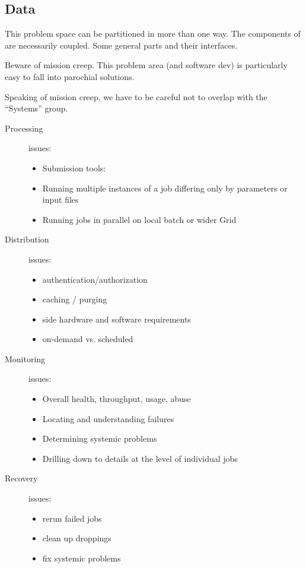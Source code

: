 \subsection{Data}

This problem space can be partitioned in more than one way.  The
components of are necessarily coupled.  Some general parts and their
interfaces.

Beware of mission creep.  This problem area (and software dev) is particularly easy to fall into parochial solutions.

Speaking of mission creep, we have to be careful not to overlap with the ``Systems'' group.

\begin{description}
\item[Processing] issues:

  \begin{itemize}
  \item Submission tools:
  \item Running multiple instances of a job differing only by parameters or input files
  \item Running jobs in parallel on local batch or wider Grid
  \end{itemize}
\item[Distribution] issues:
  \begin{itemize}
  \item authentication/authorization
  \item caching / purging
  \item side hardware and software requirements
  \item on-demand vs. scheduled
  \end{itemize}
\item[Monitoring] issues:
  \begin{itemize}
  \item Overall health, throughput, usage, abuse
  \item Locating and understanding failures
  \item Determining systemic problems
  \item Drilling down to details at the level of individual jobs
  \end{itemize}
\item[Recovery] issues:
  \begin{itemize}
  \item rerun failed jobs
  \item clean up droppings
  \item fix systemic problems

\end{itemize}
\end{description}
